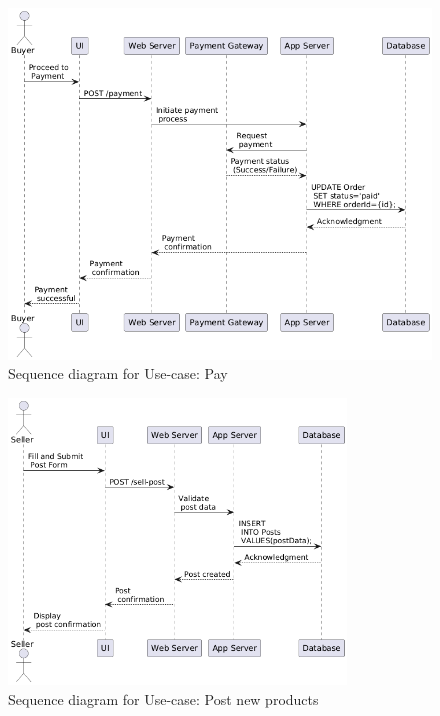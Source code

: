 \begin{figure}[!h]
	\centering
	\includegraphics[width=1\textwidth]{chapters/ch-04/302_usecase_pay.png} %
	\caption{Sequence diagram for Use-case: Pay}
	\label{fig:seq_03} %
\end{figure}

\begin{figure}[!h]
	\centering
	\includegraphics[width=0.8\textwidth]{chapters/ch-04/303_usecase_post.png} %
	\caption{Sequence diagram for Use-case: Post new products}
	\label{fig:seq_04} %
\end{figure}

